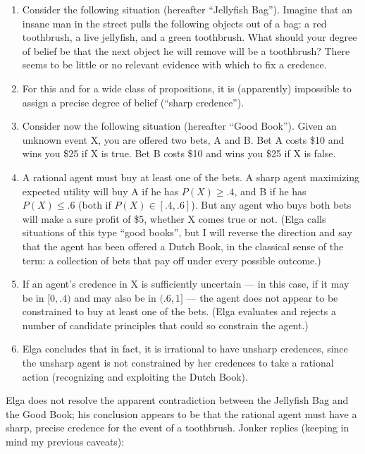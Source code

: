 \documentclass[letterpaper,12pt]{article}
\begin{document}
\begin{enumerate}
\item
Consider the following situation (hereafter ``Jellyfish Bag''). Imagine that an insane man in the street pulls the following objects out of a bag: a red toothbrush, a live jellyfish, and a green toothbrush. What should your degree of belief be that the next object he will remove will be a toothbrush? There seems to be little or no relevant evidence with which to fix a credence.
\item
For this and for a wide class of propositions, it is (apparently) impossible to assign a precise degree of belief (``sharp credence'').
\item
Consider now the following situation (hereafter ``Good Book''). Given an unknown event X, you are offered two bets, A and B. Bet A costs \$10 and wins you \$25 if X is true. Bet B costs \$10 and wins you \$25 if X is false.
\item
A rational agent must buy at least one of the bets. A sharp agent maximizing expected utility will buy A if he has $P(X) \geq .4$, and B if he has $P(X) \leq .6$ (both if $P(X) \in [.4, .6]$). But any agent who buys both bets will make a sure profit of \$5, whether X comes true or not. (Elga calls situations of this type ``good books'', but I will reverse the direction and say that the agent has been offered a Dutch Book, in the classical sense of the term: a collection of bets that pay off under every possible outcome.)
\item
If an agent's credence in X is sufficiently uncertain --- in this case, if it may be in $[0, .4)$ and may also be in $(.6, 1]$ --- the agent does not appear to be constrained to buy at least one of the bets. (Elga evaluates and rejects a number of candidate principles that could so constrain the agent.)
\item
Elga concludes that in fact, it is irrational to have unsharp credences, since the unsharp agent is not constrained by her credences to take a rational action (recognizing and exploiting the Dutch Book).
\end{enumerate}

Elga does not resolve the apparent contradiction between the Jellyfish Bag and the Good Book; his conclusion appears to be that the rational agent must have a sharp, precise credence for the event of a toothbrush. Jonker \citeyearpar{jonker2012} replies (keeping in mind my previous caveats):
\end{document}
